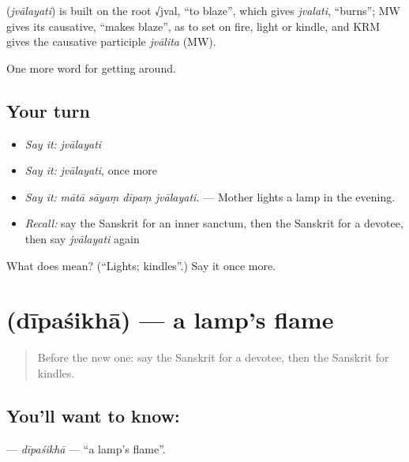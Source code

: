 \begin{cousinweb}
\textbf{} (\emph{jvālayati}) is built on the root √jval, \textquotedblleft{}to blaze\textquotedblright{}, which gives \emph{jvalati}, \textquotedblleft{}burns\textquotedblright{}; MW gives its causative, \textquotedblleft{}makes blaze\textquotedblright{}, as to set on fire, light or kindle, and KRM gives the causative participle \emph{jvālita} (MW).
\end{cousinweb}

\begin{grammarlens}[title={What you've built}]
One more word for getting around.
\end{grammarlens}

\subsection*{Your turn}
\begin{itemize}
\raggedright
  \item \emph{Say it:} \emph{jvālayati}
  \item \emph{Say it:} \emph{jvālayati}, once more
  \item \emph{Say it:} \emph{mātā sāyaṃ dīpaṃ jvālayati.} — Mother lights a lamp in the evening.
  \item \emph{Recall:} say the Sanskrit for an inner sanctum, then the Sanskrit for a devotee, then say \emph{jvālayati} again
\end{itemize}

\begin{tcolorbox}[breakable,colback=teal!4,colframe=teal!35!black,title={Before you move on}]
What does  mean? (\textquotedblleft{}Lights; kindles\textquotedblright{}.) Say it once more.
\end{tcolorbox}
\section[\texorpdfstring{\sk{दीपशिखा} (dīpaśikhā)}{दीपशिखा (dīpaśikhā)}]{ (dīpaśikhā) — a lamp's flame}

\label{lesson:SA-C397-dipasikha}



\begin{quote}
Before the new one: say the Sanskrit for a devotee, then the Sanskrit for kindles.
\end{quote}

\subsection*{You'll want to know: }
\textbf{} — \emph{dīpaśikhā} — \textquotedblleft{}a lamp's flame\textquotedblright{}.

